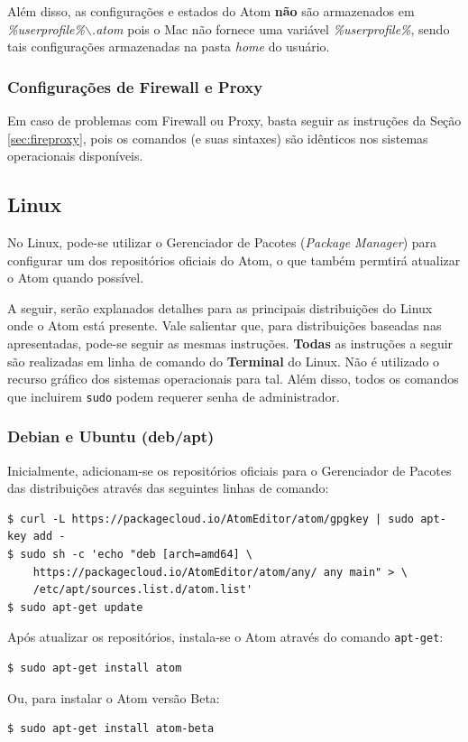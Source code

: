 	Além disso, as configurações e estados do Atom \textbf{não} são armazenados em \textit{\%userprofile\%$\backslash$.atom} pois o Mac não fornece uma variável \textit{\%userprofile\%}, sendo tais configurações armazenadas na pasta \textit{home} do usuário.

	\subsubsection{Configurações de Firewall e Proxy}
	Em caso de problemas com Firewall ou Proxy, basta seguir as instruções da Seção	\ref{sec:fireproxy}, pois os comandos (e suas sintaxes) são idênticos nos sistemas operacionais disponíveis.

	\subsection{Linux}
	No Linux, pode-se utilizar o Gerenciador de Pacotes (\textit{Package Manager}) para configurar um dos repositórios oficiais do Atom, o que também permtirá atualizar o Atom quando possível.

	A seguir, serão explanados detalhes para as principais distribuições do Linux onde o Atom está presente. Vale salientar que, para distribuições baseadas nas apresentadas, pode-se seguir as mesmas instruções. \textbf{Todas} as instruções a seguir são realizadas em linha de comando do \textbf{Terminal} do Linux. Não é utilizado o recurso gráfico dos sistemas operacionais para tal. Além disso, todos os comandos que incluirem \verb|sudo| podem requerer senha de administrador.

	\subsubsection{Debian e Ubuntu (deb/apt)}
	Inicialmente, adicionam-se os repositórios oficiais para o Gerenciador de Pacotes das distribuições através das seguintes linhas de comando:
	\begin{Verbatim}[fontsize=\footnotesize]
$ curl -L https://packagecloud.io/AtomEditor/atom/gpgkey | sudo apt-key add -
$ sudo sh -c 'echo "deb [arch=amd64] \
	https://packagecloud.io/AtomEditor/atom/any/ any main" > \
	/etc/apt/sources.list.d/atom.list'
$ sudo apt-get update
	\end{Verbatim}

	Após atualizar os repositórios, instala-se o Atom através do comando \verb|apt-get|:
	\begin{Verbatim}[fontsize=\footnotesize]
$ sudo apt-get install atom
	\end{Verbatim}
	Ou, para instalar o Atom versão Beta:
	\begin{Verbatim}[fontsize=\footnotesize]
$ sudo apt-get install atom-beta
	\end{Verbatim}

